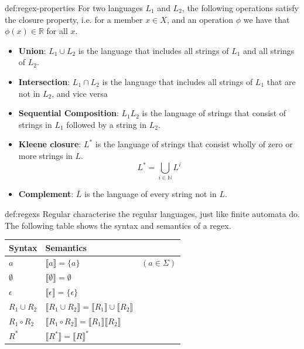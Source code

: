\documentclass[landscape, 8pt]{extarticle}
\begin{document}
\begin{multicols}{3}
\begin{dfn}{def:regex-properties}{}
    For two languages $L_{1}$ and $L_{2}$, the following operations satisfy the closure property, i.e. for a member $x\in X$, and an operation $\phi$ we have that $\phi(x)\in\mathbb{R}$ for all $x$.
    \renewcommand\labelitemi{\tiny$\bullet$}
    \begin{itemize}
        \setlength\itemsep{0em}
        \item \textbf{Union}: $L_{1}\cup L_{2}$ is the language that includes all strings of $L_{1}$ and all strings of $L_{2}$. 
        \item \textbf{Intersection}: $L_{1}\cap L_{2}$ is the language that includes all strings of $L_{1}$ that are not in $L_{2}$, and vice versa
        \item \textbf{Sequential Composition}: $L_{1}L_{2}$ is the language of strings that consist of strings in $L_{1}$ followed by a string in $L_{2}$.
        \item \textbf{Kleene closure}: $L^{*}$ is the language of strings that consist wholly of zero or more strings in $L$.
        \[L^{*} = \bigcup_{i\in\mathbb{N}} L^{i}\]
        \item \textbf{Complement}: $\bar{L}$ is the language of every string not in $L$.
    \end{itemize}
\end{dfn}


\begin{dfn}{def:regexs}{}
Regular characterise the regular languages, just like finite automata do.
The following table shows the syntax and semantics of a regex.

\begin{table}[H]
    \begin{tabular}{l|ll}
    Syntax & Semantics                                                                                       &                  \\ \hline
    $a$             & $\llbracket a \rrbracket = \{a\}$                                                               & $(a \in \Sigma)$ \\
    $\emptyset$     & $\llbracket \emptyset \rrbracket = \emptyset$                                                   &                  \\
    $\epsilon$      & $\llbracket \epsilon \rrbracket = \{\epsilon\}$                                                 &                  \\
    $R_1 \cup R_2$  & $\llbracket R_1 \cup R_2 \rrbracket = \llbracket R_1 \rrbracket \cup \llbracket R_2 \rrbracket$ &                  \\
    $R_1 \circ R_2$ & $\llbracket R_1 \circ R_2 \rrbracket = \llbracket R_1 \rrbracket \llbracket R_2 \rrbracket$     &                  \\
    $R^*$           & $\llbracket R^* \rrbracket = \llbracket R \rrbracket^*$                                         &                 
    \end{tabular}
    \centering
\end{table}



\end{dfn}
\end{multicols}
\end{document}

